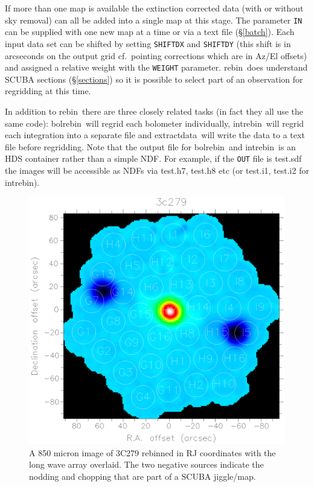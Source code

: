 \documentclass[twoside,11pt]{article}
\newcommand{\task}[1]{{\sf #1}}
\newcommand{\param}[1]{{\tt #1}}
\newcommand{\rebin}{\htmlref{\task{rebin}}{REBIN}}
\newcommand{\bolrebin}{\htmlref{\task{bolrebin}}{BOLREBIN}}
\newcommand{\intrebin}{\htmlref{\task{intrebin}}{INTREBIN}}
\newcommand{\extdata}{\htmlref{\task{extract\_data}}{EXTRACT_DATA}}
\newcommand{\htmlref}[2]{#1}
\newcommand{\htmlimage}[1]{}
\renewcommand{\_}{\texttt{\symbol{95}}}
\begin{document}
If more than one map is available the extinction corrected data (with or
without sky removal) can all be added into a single map at this stage. The
parameter \param{IN} can be supplied with one new map at a time or via a text
file (\S\ref{batch}). Each input data set can be shifted by setting
\param{SHIFT\_DX} and \param{SHIFT\_DY} (this shift is in arcseconds on the
output grid cf.\ pointing corrections which are in Az/El offsets) and assigned
a relative weight with the \param{WEIGHT} parameter. \rebin\ does understand
SCUBA sections (\S\ref{sections}) so it is possible to select part of an
observation for regridding at this time.

In addition to \rebin\ there are three closely related tasks (in fact they all
use the same code): \bolrebin\ will regrid each bolometer individually,
\intrebin\ will regrid each integration into a separate file and \extdata\
will write the data to a text file before regridding.  Note that the output
file for \bolrebin\ and \intrebin\ is an HDS container \cite{hds} rather than
a simple NDF.  For example, if the \param{OUT} file is test.sdf the images
will be accessible as NDFs via test.h7, test.h8 etc (or test.i1, test.i2 for
\intrebin).


\begin{figure}
\begin{center}
\includegraphics[width=\textwidth]{sun216_3c279.eps}
\caption{A 850 micron image of 3C279 rebinned in RJ coordinates with the
long wave array overlaid. The two negative sources indicate the nodding 
and chopping that are part of a SCUBA jiggle/map.}
\label{image}
\end{center}
\end{figure}
\end{document}
